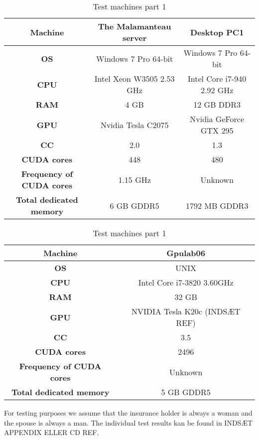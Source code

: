 \begin{table}
\begin{center}
\begin{tabular}{|c|c|c|}
	\hline
	\multicolumn{1}{|m{2.8cm}|}{\centering \textbf{Machine}} & The Malamanteau server & Desktop PC1 \\ \hline
	\multicolumn{1}{|m{2.8cm}|}{\centering \textbf{OS}} & Windows 7 Pro 64-bit & Windows 7 Pro 64-bit\\ \hline
	\multicolumn{1}{|m{2.8cm}|}{\centering \textbf{CPU}} & Intel Xeon W3505 2.53 GHz & Intel Core i7-940 2.92 GHz \\ \hline
	\multicolumn{1}{|m{2.8cm}|}{\centering \textbf{RAM}} & 4 GB & 12 GB DDR3\\ \hline
	\multicolumn{1}{|m{2.8cm}|}{\centering \textbf{GPU}} & Nvidia Tesla C2075\cite{tesl} & Nvidia GeForce GTX 295 \cite{gtxx}\\ \hline
	\multicolumn{1}{|m{2.8cm}|}{\centering \textbf{CC}} & 2.0 & 1.3\\ \hline
	\multicolumn{1}{|m{2.8cm}|}{\centering \textbf{CUDA cores}} & 448 & 480\\ \hline
	\multicolumn{1}{|m{2.8cm}|}{\centering \textbf{Frequency of CUDA cores}} & 1.15 GHz & Unknown\\ \hline
	\multicolumn{1}{|m{2.8cm}|}{\centering \textbf{Total dedicated memory}} & 6 GB GDDR5 & 1792 MB GDDR3\\ \hline
\end{tabular}
\end{center}
\caption{Test machines part 1}
\end{table}

\begin{table}
\begin{center}
\begin{tabular}{|c|c|}
	\hline
	\multicolumn{1}{|m{2.8cm}|}{\centering \textbf{Machine}} & Gpulab06 \\ \hline
	\multicolumn{1}{|m{2.8cm}|}{\centering \textbf{OS}} & UNIX \\ \hline
	\multicolumn{1}{|m{2.8cm}|}{\centering \textbf{CPU}} & Intel Core i7-3820 3.60GHz \\ \hline
	\multicolumn{1}{|m{2.8cm}|}{\centering \textbf{RAM}} & 32 GB \\ \hline
	\multicolumn{1}{|m{2.8cm}|}{\centering \textbf{GPU}} & NVIDIA Tesla K20c (INDSÆT REF) \\ \hline
	\multicolumn{1}{|m{2.8cm}|}{\centering \textbf{CC}} & 3.5 \\ \hline
	\multicolumn{1}{|m{2.8cm}|}{\centering \textbf{CUDA cores}} & 2496 \\ \hline
	\multicolumn{1}{|m{2.8cm}|}{\centering \textbf{Frequency of CUDA cores}} & Unknown \\ \hline
	\multicolumn{1}{|m{2.8cm}|}{\centering \textbf{Total dedicated memory}} & 5 GB GDDR5 \\ \hline
\end{tabular}
\end{center}
\caption{Test machines part 1}
\end{table}

For testing purposes we assume that the insurance holder is always a woman and the spouse is always a man. The individual test results kan be found in INDSÆT APPENDIX ELLER CD REF.

